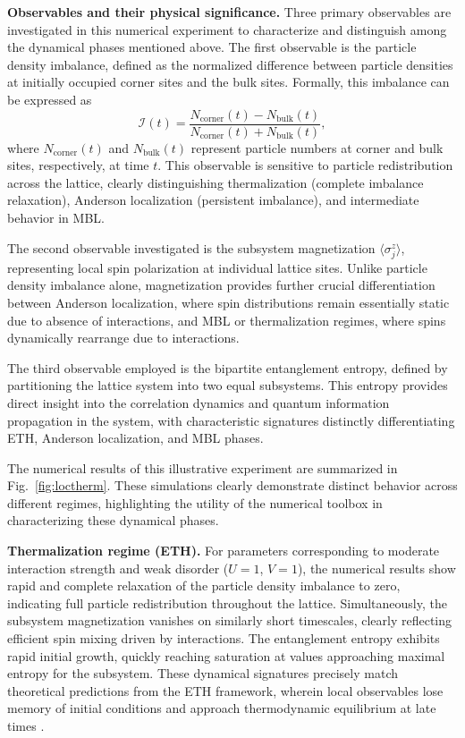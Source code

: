 \textbf{Observables and their physical significance.}
Three primary observables are investigated in this numerical experiment to characterize and distinguish among the dynamical phases mentioned above. The first observable is the particle density imbalance, defined as the normalized difference between particle densities at initially occupied corner sites and the bulk sites. Formally, this imbalance can be expressed as
\begin{equation}
\mathcal{I}(t) = \frac{N_\text{corner}(t)-N_\text{bulk}(t)}{N_\text{corner}(t)+N_\text{bulk}(t)},
\end{equation}
where $N_\text{corner}(t)$ and $N_\text{bulk}(t)$ represent particle numbers at corner and bulk sites, respectively, at time $t$. This observable is sensitive to particle redistribution across the lattice, clearly distinguishing thermalization (complete imbalance relaxation), Anderson localization (persistent imbalance), and intermediate behavior in MBL.

The second observable investigated is the subsystem magnetization $\langle \sigma_j^z\rangle$, representing local spin polarization at individual lattice sites. Unlike particle density imbalance alone, magnetization provides further crucial differentiation between Anderson localization, where spin distributions remain essentially static due to absence of interactions, and MBL or thermalization regimes, where spins dynamically rearrange due to interactions.

The third observable employed is the bipartite entanglement entropy, defined by partitioning the lattice system into two equal subsystems. This entropy provides direct insight into the correlation dynamics and quantum information propagation in the system, with characteristic signatures distinctly differentiating ETH, Anderson localization, and MBL phases.

The numerical results of this illustrative experiment are summarized in Fig.~\ref{fig:loctherm}. These simulations clearly demonstrate distinct behavior across different regimes, highlighting the utility of the numerical toolbox in characterizing these dynamical phases.


\textbf{Thermalization regime (ETH).}
For parameters corresponding to moderate interaction strength and weak disorder ($U=1$, $V=1$), the numerical results show rapid and complete relaxation of the particle density imbalance to zero, indicating full particle redistribution throughout the lattice. Simultaneously, the subsystem magnetization vanishes on similarly short timescales, clearly reflecting efficient spin mixing driven by interactions. The entanglement entropy exhibits rapid initial growth, quickly reaching saturation at values approaching maximal entropy for the subsystem. These dynamical signatures precisely match theoretical predictions from the ETH framework, wherein local observables lose memory of initial conditions and approach thermodynamic equilibrium at late times \cite{deutsch_quantum_1991,srednicki_chaos_1994}.

